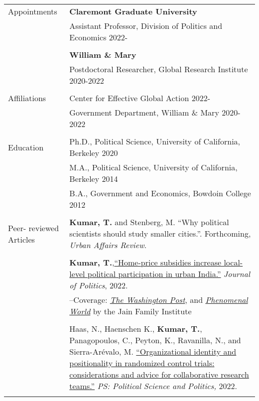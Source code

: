 \documentclass[letterpaper, 10pt]{article}
\begin{document}
\begin{longtable}{p{1.5in}p{5in}}

Appointments 
& \textbf{Claremont Graduate University} \hfill  \\
& Assistant Professor, Division of Politics and Economics \hfill  2022-\\

& \\

& \textbf{William \& Mary} \hfill \\
& Postdoctoral Researcher, Global Research Institute \hfill 2020-2022 \\


& \\

Affiliations & Center for Effective Global Action \hfill 2022-\\
& Government Department, William \& Mary \hfill 2020-2022  \\
& \\
{Education} 
&Ph.D., Political Science, University of California, Berkeley \hfill 2020 \\


& M.A., Political Science, University of California, Berkeley \hfill 2014 \\
& B.A., Government and Economics, Bowdoin College  \hfill 2012 \\

& \\
\nohyphens{{Peer- reviewed Articles}} 
& \textbf{Kumar, T.} and Stenberg, M. ``Why political scientists should study smaller cities.''. Forthcoming, \textit{Urban Affairs Review}. \\
& \\
& \textbf{Kumar, T.},\href{https://doi.org/10.1086/715605}{``Home-price subsidies increase local-level political participation in urban India.''} \textit{Journal of Politics}, 2022.\\
& --\indent Coverage: \href{https://www.washingtonpost.com/news/monkey-cage/wp/2019/01/31/heres-what-gavin-newsom-elizabeth-warren-and-microsoft-should-know-if-want-to-end-the-affordable-housing-crisis/?tid=sm_tw_cage}{\textit{The Washington Post}}, and \href{https://www.phenomenalworld.org/sources/original-and-forgery/}{\textit{Phenomenal World}} by the Jain Family Institute  \\
& \\
& Haas, N., Haenschen K., \textbf{Kumar, T.}, Panagopoulos, C., Peyton, K., Ravanilla, N., and Sierra-Ar\'{e}valo, M. \href{https://www.doi.org/10.1017/S1049096522000026}{``Organizational identity and positionality in randomized control trials: considerations and advice for collaborative research teams.''} \textit{PS: Political Science and Politics,} 2022. \\
& \\



\end{longtable}
\end{document}
